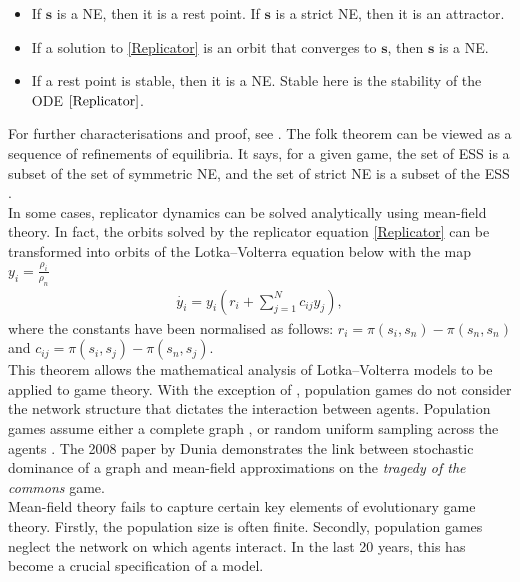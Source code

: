 \begin{itemize}
    \item If $\mathbf{s}$ is a NE, then it is a rest point. If $\mathbf{s}$ is a strict NE, then it is an attractor. 
    \item If a solution to \eqref{Replicator} is an orbit that converges to $\mathbf{s}$, then $\mathbf{s}$ is a NE. 
    \item If a rest point is stable, then it is a NE. Stable here is the stability of the ODE $\eqref{Replicator}$. 
\end{itemize}
For further characterisations and proof, see \cite{RN99, RN81}. The folk theorem can be viewed as a sequence of refinements of equilibria. It says,  for a given game, the set of ESS is a subset of the set of symmetric NE, and the set of strict NE is a subset of the ESS \cite{RN91}.  \\


In some cases, replicator dynamics can be solved analytically using mean-field theory. In fact, the orbits solved by the replicator equation \eqref{Replicator} can be transformed into orbits of the Lotka--Volterra equation below with the map $y_i = \frac{\rho_i}{\rho_n}$ \cite{RN81}\\
\begin{align*} \label{LV}
    \dot{y_i} = y_i\left ( r_i + \sum_{j =1}^N c_{ij} y_j \right ),
\end{align*}
where the constants have been normalised as follows: $r_i = \pi(s_i,s_n) - \pi(s_n,s_n)$ and $c_{ij} = \pi(s_i,s_j) - \pi(s_n,s_j)$. \\


This theorem allows the mathematical analysis of Lotka--Volterra models to be applied to game theory. With the exception of \cite{RN75}, population games do not consider the network structure that dictates the interaction between agents. Population games assume either a complete graph \cite{RN67}, or random uniform sampling across the agents \cite{RN47}. The 2008 paper by Dunia \cite{RN75} demonstrates the link between stochastic dominance of a graph and mean-field approximations on the \emph{tragedy of the commons} game. \\

Mean-field theory fails to capture certain key elements of evolutionary game theory. Firstly, the population size is often finite. Secondly, population games neglect the network on which agents interact. In the last 20 years, this has become a crucial specification of a model. \\

